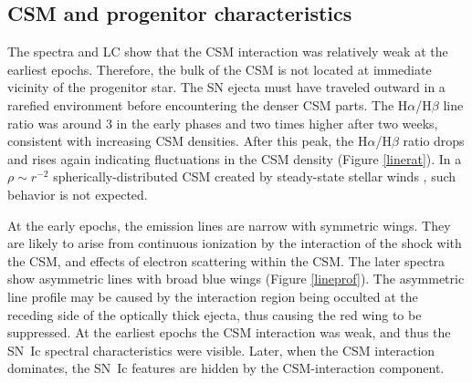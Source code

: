 \documentclass[twocolumn]{aastex61}
\begin{document}
\subsection{CSM and progenitor characteristics}

The spectra and LC show that the CSM interaction was relatively weak at the earliest epochs.
Therefore, the bulk of the CSM is not located {at immediate vicinity of} the progenitor star. The SN ejecta must have traveled outward in a rarefied environment before encountering the denser CSM parts. The H$\alpha$/H$\beta$ line ratio was around 3 in the early phases and {two times} higher after two weeks, consistent with increasing CSM densities.
After this peak, the H$\alpha$/H$\beta$ ratio drops and rises again indicating fluctuations in the CSM density (Figure \ref{linerat}). 
In a $\rho \sim r^{-2}$ spherically-distributed CSM created by steady-state stellar winds \citep{cf94}, such behavior is not expected. 

At the early epochs, the emission lines are narrow with symmetric wings. They are likely to arise from continuous ionization by the interaction of the shock with the CSM, and {effects of electron scattering within the CSM}. 
The later spectra show asymmetric lines with broad blue wings (Figure \ref{lineprof}). 
The asymmetric line profile may be caused by the interaction region being occulted at the {receding} side of the optically thick {ejecta}, thus causing the red wing to be suppressed. 
At the earliest epochs the CSM interaction was weak, and thus the SN~Ic spectral characteristics were visible. Later, when the CSM interaction dominates, the SN~Ic features are hidden by the CSM-interaction component.
\end{document}
